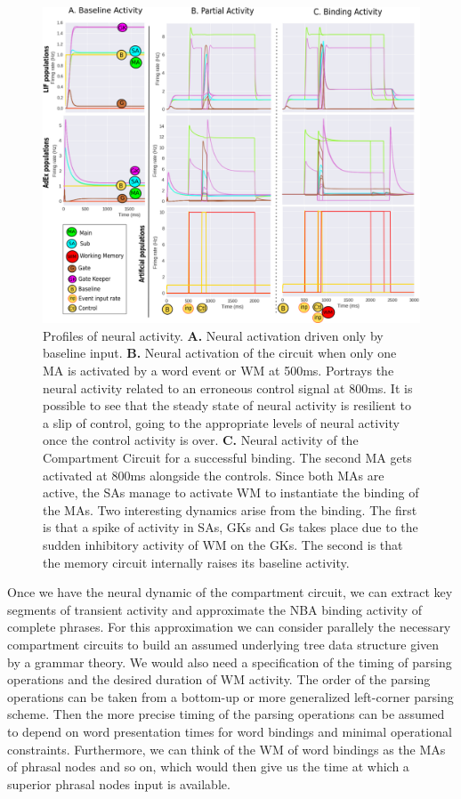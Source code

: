 \documentclass[10pt]{article}
\begin{document}
\begin{figure}[h!]
  \begin{center}
    \includegraphics[width=0.70\columnwidth]{figures/compartment_circuit_dynamics/compartment_circuit_dynamics}
    \caption{Profiles of neural activity.
      \textbf{A.} Neural activation driven only by baseline input. \textbf{B.} Neural activation of the circuit when only one MA is activated by a word event or WM at 500ms.
      Portrays the neural activity related to an erroneous control signal at 800ms.
      It is possible to see that the steady state of neural activity is resilient to a slip of control, going to the appropriate levels of neural activity once the control activity is over.
      \textbf{C.} Neural activity of the Compartment Circuit for a successful binding.
      The second MA gets activated at 800ms alongside the controls.
      Since both MAs are active, the SAs manage to activate WM to instantiate the binding of the MAs.
      Two interesting dynamics arise from the binding.
      The first is that a spike of activity in SAs, GKs and Gs takes place due to the sudden inhibitory activity of WM on the GKs.
      The second is that the memory circuit internally raises its baseline activity.%
    }

      \label{activity_profiles}
  \end{center}
\end{figure}

Once we have the neural dynamic of the compartment circuit, we can extract key segments of transient activity and approximate the NBA binding activity of complete phrases.
For this approximation we can consider parallely the necessary compartment circuits to build an assumed underlying tree data structure given by a grammar theory.
We would also need a specification of the timing of parsing operations and the desired duration of WM activity.
The order of the parsing operations can be taken from a bottom-up or more generalized left-corner parsing scheme.
Then the more precise timing of the parsing operations can be assumed to depend on word presentation times for word bindings and minimal operational constraints.
Furthermore, we can think of the WM of word bindings as the MAs of phrasal nodes and so on, which would then give us the time at which a superior phrasal nodes input is available.
\end{document}

